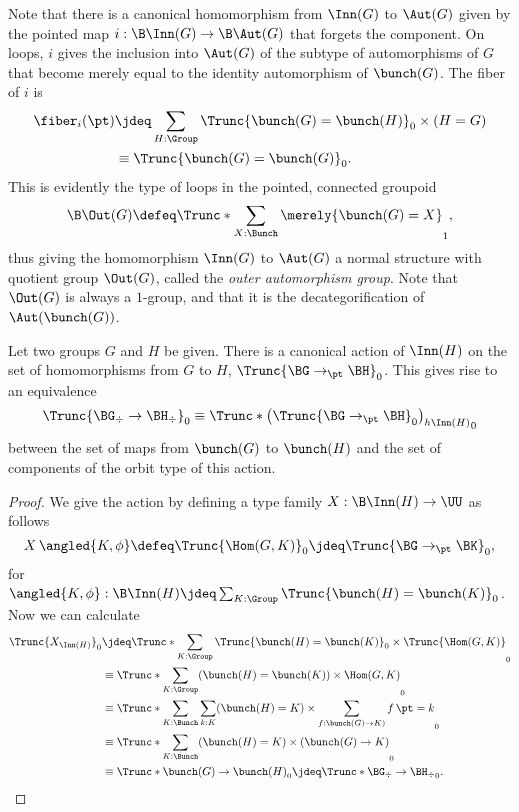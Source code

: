 Note that there is a canonical homomorphism from $\Inn(G)$ to $\Aut(G)$
given by the pointed map $i : \B\Inn(G) \to \B\Aut(G)$ that forgets the component.
On loops, $i$ gives the inclusion into $\Aut(G)$ of the subtype of automorphisms of $G$
that become merely equal to the identity automorphism of $\bunch(G)$.
The fiber of $i$ is
\begin{align*}
  \fiber_i(\pt)
  &\jdeq \sum_{H : \Group} \Trunc{\bunch(G) = \bunch(H)}_0 \times (H = G) \\
  &\equiv \Trunc{\bunch(G) = \bunch(G)}_0.
\end{align*}
This is evidently the type of loops in the pointed, connected groupoid
\[
  \B\Out(G) \defeq \Trunc*{\sum_{X : \Bunch}\merely{\bunch(G) = X}}_1,
\]
thus giving the homomorphism $\Inn(G)$ to $\Aut(G)$ a normal structure with
quotient group $\Out(G)$, called the \emph{outer automorphism group}.
Note that $\Out(G)$ is always a $1$-group,
and that it is the decategorification of $\Aut(\bunch(G))$.

\begin{theorem}
  Let two groups $G$ and $H$ be given.
  There is a canonical action of $\Inn(H)$
  on the set of homomorphisms from $G$ to $H$, $\Trunc{\BG \to_\pt \BH}_0$.
  This gives rise to an equivalence
  \[
    \Trunc{\BG_\div \to \BH_\div}_0 \equiv \Trunc*{\left(\Trunc{\BG \to_\pt \BH}_0\right) _{h\Inn(H)}}_0
  \]
  between the set of maps from $\bunch(G)$ to $\bunch(H)$ and the set of
  components of the orbit type of this action.
\end{theorem}
\begin{proof}
  We give the action by defining a type family $X : \B\Inn(H) \to \UU$ as follows
  \[
    X\, \angled{K,\phi} \defeq \Trunc{\Hom(G,K)}_0 \jdeq \Trunc{\BG \to_\pt \BK}_0,
  \]
  for $\angled{K,\phi} : \B\Inn(H) \jdeq \sum_{K : \Group} \Trunc{\bunch(H) = \bunch(K)}_0$.
  Now we can calculate
  \begin{align*}
    \Trunc{X_{\Inn(H)}}_0
    &\jdeq \Trunc*{\sum_{K:\Group}\Trunc{\bunch(H)=\bunch(K)}_0\times\Trunc{\Hom(G,K)}}_0 \\
    &\equiv \Trunc*{\sum_{K:\Group}(\bunch(H)=\bunch(K))\times\Hom(G,K)}_0 \\
    &\equiv \Trunc*{\sum_{K:\Bunch}\sum_{k:K}(\bunch(H)=K)\times\sum_{f:\bunch(G)\to K)}\mathop f \pt = k}_0 \\
    &\equiv \Trunc*{\sum_{K:\Bunch} (\bunch(H)=K) \times(\bunch(G) \to K)}_0 \\
    &\equiv \Trunc*{\bunch(G)\to\bunch(H)}_0 \jdeq \Trunc*{\BG_\div \to \BH_\div}_0.\qedhere
  \end{align*}
\end{proof}

